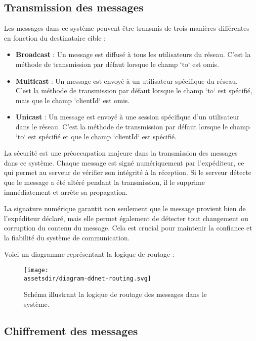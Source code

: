 \subsection{Transmission des messages}

Les messages dans ce système peuvent être transmis de trois manières différentes en fonction du destinataire cible :

\begin{itemize}
    \item \textbf{Broadcast} : Un message est diffusé à tous les utilisateurs du réseau. C'est la méthode de transmission par défaut lorsque le champ `to` est omis.
    \item \textbf{Multicast} : Un message est envoyé à un utilisateur spécifique du réseau. C'est la méthode de transmission par défaut lorsque le champ `to` est spécifié, mais que le champ `clientId` est omis.
    \item \textbf{Unicast} : Un message est envoyé à une session spécifique d'un utilisateur dans le réseau. C'est la méthode de transmission par défaut lorsque le champ `to` est spécifié et que le champ `clientId` est spécifié.
\end{itemize}

La sécurité est une préoccupation majeure dans la transmission des messages dans ce système. Chaque message est signé numériquement par l'expéditeur, ce qui permet au serveur de vérifier son intégrité à la réception. Si le serveur détecte que le message a été altéré pendant la transmission, il le supprime immédiatement et arrête sa propagation.

La signature numérique garantit non seulement que le message provient bien de l'expéditeur déclaré, mais elle permet également de détecter tout changement ou corruption du contenu du message. Cela est crucial pour maintenir la confiance et la fiabilité du système de communication.

Voici un diagramme représentant la logique de routage :

\begin{figure}[H]
    \begin{center}
        \texttt{[image: \\assetsdir/diagram-ddnet-routing.svg]}
    \end{center}
    \caption[Logique de Routage des Messages]{Schéma illustrant la logique de routage des messages dans le système.}
\end{figure}


\subsection{Chiffrement des messages}

